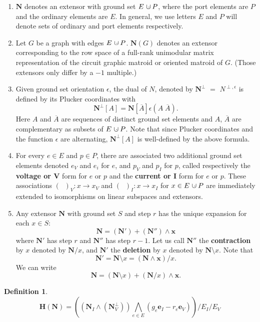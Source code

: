 \documentclass[12pt]{article}
\theoremstyle{definition}
\newtheorem{definition}[theorem]{Definition}
\newcommand{\dunion}
{\mbox{\hbox{\hskip6pt$\cdot$\hskip-5.50pt$\cup$\hskip2pt}}}
\newcommand{\scomp}[1]{\ensuremath{\overline{#1}}}
\newcommand{\ext}[1]{\ensuremath{\mathbf{#1}}}
\begin{document}
\begin{enumerate}
\item $\ext{N}$ denotes an extensor with ground set $E\dunion P$,
where the port elements are $P$ and the ordinary elements are $E$.
In general, we use letters $E$ and $P$ will denote sets of ordinary 
and port elements respectively.
\item Let $G$ be a graph with edges $E\dunion P$.
$\ext{N}(G)$ denotes an extensor corresponding to the 
row space of a full-rank unimodular matrix representation
of the circuit graphic matroid or oriented matroid of $G$.
(Those extensors only differ by a $-1$ multiple.)
\item Given ground set orientation $\epsilon$, the dual
of $N$, denoted by $\ext{N}^{\perp}$ $=$ $N^{\perp,\epsilon}$
is defined by its Plucker coordinates with
\[
\ext{N}^{\perp}[A] = \ext{N}[\scomp{A}] \epsilon(A\;\scomp{A}).
\]
Here $A$ and $\scomp{A}$ are sequences of distinct ground set elements
and $A$, $\scomp{A}$ are complementary as subsets of $E\dunion P$.
Note that since Plucker coordinates and the function $\epsilon$
are alternating, $\ext{N}^{\perp}[A]$ is well-defined by the
above formula.
\item
For every $e\in E$ and $p\in P$, there are associated
two additional ground set elements denoted
$e_V$ and $e_i$ for $e$, and $p_V$ and $p_I$ for $p$,
called respectively the {\bf voltage or V} form for 
$e$ or $p$ and the {\bf current or I} form for 
$e$ or $p$.  These associations 
$(\;\;)_V: x \rightarrow x_V$ and
$(\;\;)_I: x \rightarrow x_I$ for $x\in E\dunion P$
are immediately extended to isomorphisms
on linear subspaces and extensors.
\item
Any extensor $\ext{N}$ with ground set $S$ 
and step $r$ has the unique
expansion for each $x\in S$:
\[
\ext{N} = (\ext{N}') + (\ext{N}'')\wedge\ext{x}
\]
where $\ext{N}'$ has step $r$ and $\ext{N}''$ has step
$r-1$.  Let us call $\ext{N}''$ the {\bf contraction}
by $x$ denoted by $\ext{N}/x$, and 
$\ext{N}'$ the {\bf deletion} by $x$ denoted by
$\ext{N}\setminus x$.  Note that
\[
\ext{N}'=\ext{N}\setminus x=(\ext{N}\wedge\ext{x})/x.
\]
We can write
\begin{equation}
\label{newDandCexp}
\ext{N} = (\ext{N}\setminus x) + (\ext{N}/x)\wedge\ext{x}.
\end{equation}
\end{enumerate}

\begin{definition}
\[
\ext{H}(\ext{N}) = 
\left(\left(\ext{N}_I\wedge(\ext{N}^{\perp}_V)\right)
\bigwedge_{e\in E}(g_e \ext{e}_I - r_e \ext{e}_V)\right)
/E_I/E_V
\]
\end{definition}
\end{document}
